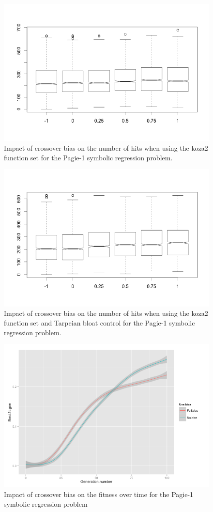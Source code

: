 \documentclass{sig-alternate}
\begin{document}
\begin{figure}
\centering
\includegraphics[width=0.45 \textwidth]{Plots/Pagie-1-koza2_no_Tarpeian.png}
\caption{Impact of crossover bias on the number of hits when using the koza2 function set for the Pagie-1 
symbolic regression problem.}
\label{fig:Pagie1Koza2}
\end{figure}

\begin{figure}
\centering
\includegraphics[width=0.45 \textwidth]{Plots/Pagie-1-tarp.png}
\caption{Impact of crossover bias on the number of hits when using the koza2 function set and Tarpeian bloat 
control for the Pagie-1 symbolic regression problem.}
\label{fig:Pagie1Koza2Tarpeian}
\end{figure}


\begin{figure}
\centering
\includegraphics[width=0.45 \textwidth]{Plots/Pagie-1_fitness_vs_time.png}
\caption{Impact of crossover bias on the fitness over time for the Pagie-1 symbolic regression problem}
\label{fig:Pagie1FitnessOverTime}
\end{figure}
\end{document}
